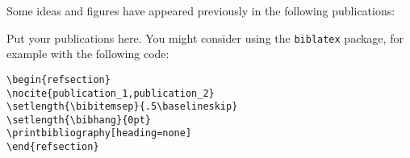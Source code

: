 Some ideas and figures have appeared previously in the following publications:

\bigskip

Put your publications here. You might consider using the \texttt{biblatex} package, for example with the following code:

\begin{verbatim}
\begin{refsection}
\nocite{publication_1,publication_2}
\setlength{\bibitemsep}{.5\baselineskip}
\setlength{\bibhang}{0pt}
\printbibliography[heading=none]
\end{refsection}
\end{verbatim}